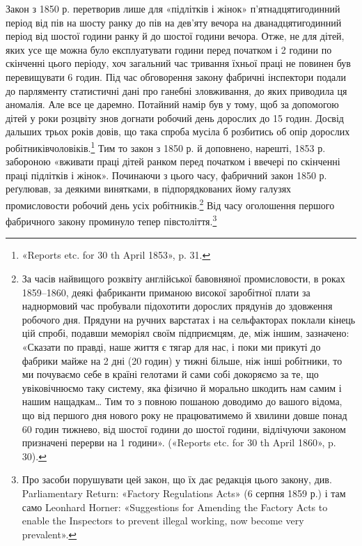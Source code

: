 Закон з 1850 р. перетворив лише для «підлітків і жінок»
п’ятнадцятигодинний період від пів на шосту ранку до пів на
дев’яту вечора на дванадцятигодинний період від шостої години
ранку й до шостої години вечора. Отже, не для дітей, яких усе
ще можна було експлуатувати  години перед початком і 2
години по скінченні цього періоду, хоч загальний час тривання
їхньої праці не повинен був перевищувати 6 годин. Під час обговорення
закону фабричні інспектори подали до парляменту статистичні
дані про ганебні зловживання, до яких приводила ця
аномалія. Але все це даремно. Потайний намір був у тому, щоб
за допомогою дітей у роки розцвіту знов догнати робочий день
дорослих до 15 годин. Досвід дальших трьох років довів, що
така спроба мусіла б розбитись об опір дорослих робітниківчоловіків.\footnote{
«Reports etc. for 30 th April 1853», p. 31.
}
Тим то закон з 1850 р. й доповнено, нарешті, 1853 р.
забороною «вживати праці дітей ранком перед початком і ввечері
по скінченні праці підлітків і жінок». Починаючи з цього часу,
фабричний закон 1850 р. реґулював, за деякими винятками, в
підпорядкованих йому галузях промисловости робочий день усіх
робітників.\footnote{
За часів найвищого розквіту англійської бавовняної промисловости,
в роках 1859--1860, деякі фабриканти приманою високої заробітної
плати за наднормовий час пробували підохотити дорослих прядунів до
здовження робочого дня. Прядуни на ручних варстатах і на сельфакторах
поклали кінець цій спробі, подавши меморіял своїм підприємцям, де, між
іншим, зазначено: «Сказати по правді, наше життя є тягар для нас, і
поки ми прикуті до фабрики майже на 2 дні (20 годин) у тижні
більше, ніж інші робітники, то ми почуваємо себе в країні гелотами й
сами собі докоряємо за те, що увіковічнюємо таку систему, яка фізично
й морально шкодить нам самим і нашим нащадкам\dots{} Тим то з повною
пошаною доводимо до вашого відома, що від першого дня нового року
не працюватимемо й хвилини довше понад 60 годин тижнево, від шостої
години до шостої години, відлічуючи законом призначені перерви на
1 години». («Reports etc. for 30 th April 1860», p. 30).
} Від часу оголошення першого фабричного закону
проминуло тепер півстоліття.\footnote{
Про засоби порушувати цей закон, що їх дає редакція цього закону,
див. Parliamentary Return: «Factory Regulations Acts» (6 серпня 1859 р.) і
там само Leonhard Horner: «Suggestions for Amending the Factory Acts to
enable the Inspectors to prevent illegal working, now become very prevalent».
}

